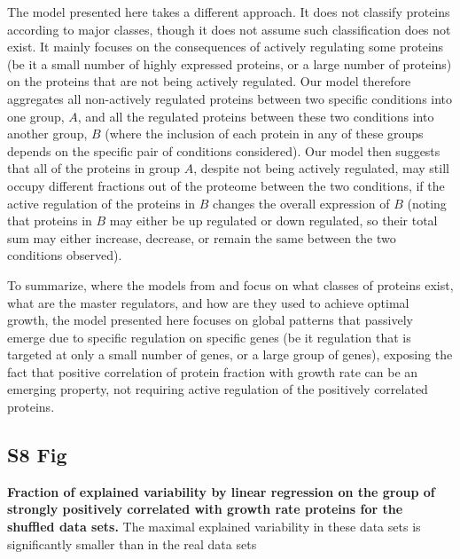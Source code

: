 \documentclass[10pt,letterpaper]{article}
\begin{document}
The model presented here takes a different approach.
It does not classify proteins according to major classes, though it does not assume such classification does not exist.
It mainly focuses on the consequences of actively regulating some proteins (be it a small number of highly expressed proteins, or a large number of proteins) on the proteins that are not being actively regulated.
Our model therefore aggregates all non-actively regulated proteins between two specific conditions into one group, $A$, and all the regulated proteins between these two conditions into another group, $B$ (where the inclusion of each protein in any of these groups depends on the specific pair of conditions considered).
Our model then suggests that all of the proteins in group $A$, despite not being actively regulated, may still occupy different fractions out of the proteome between the two conditions, if the active regulation of the proteins in $B$ changes the overall expression of $B$ (noting that proteins in $B$ may either be up regulated or down regulated, so their total sum may either increase, decrease, or remain the same between the two conditions observed).

To summarize, where the models from \cite{Scott2010,Scott2011,Scott2014} and \cite{Hui_2015} focus on what classes of proteins exist, what are the master regulators, and how are they used to achieve optimal growth, the model presented here focuses on global patterns that passively emerge due to specific regulation on specific genes (be it regulation that is targeted at only a small number of genes, or a large group of genes), exposing the fact that positive correlation of protein fraction with growth rate can be an emerging property, not requiring active regulation of the positively correlated proteins.

\subsection*{S8 Fig}
\label{fig:shuffledexpvar}
    {\bf Fraction of explained variability by linear regression on the group of strongly positively correlated with growth rate proteins for the shuffled data sets.}
The maximal explained variability in these data sets is significantly smaller than in the real data sets
%
\end{document}
